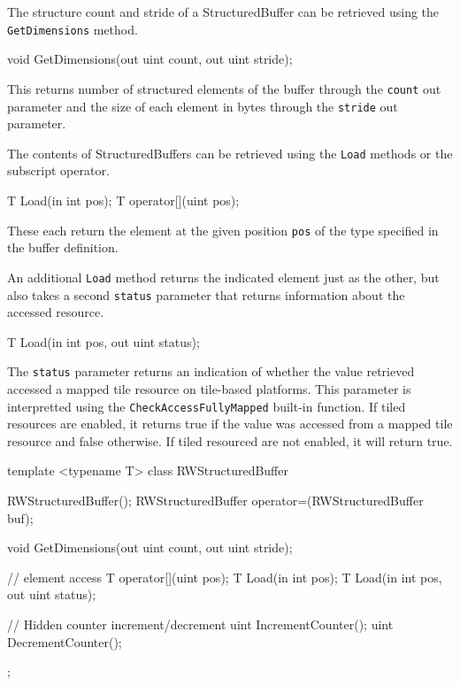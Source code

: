 
The structure count and stride of a StructuredBuffer can be retrieved using the \texttt{GetDimensions} method.
\begin{HLSL}
void GetDimensions(out uint count, out uint stride);
\end{HLSL}

This returns number of structured elements of the buffer through the \texttt{count} out parameter
and the size of each element in bytes through the \texttt{stride} out parameter.


The contents of StructuredBuffers can be retrieved using the \texttt{Load} methods
or the subscript operator.

\begin{HLSL}
 T Load(in int pos);
 T operator[](uint pos);
\end{HLSL}

These each return the element at the given position \texttt{pos} of the type specified in the buffer definition.

An additional \texttt{Load} method returns the indicated element just as the other,
but also takes a second \texttt{status} parameter that returns information about the accessed resource.
\begin{HLSL}
 T Load(in int pos, out uint status);
\end{HLSL}

The \texttt{status} parameter returns an indication of whether the value retrieved accessed a mapped tile
resource on tile-based platforms. This parameter is interpretted using the \texttt{CheckAccessFullyMapped}
built-in function. If tiled resources are enabled, it returns true if the value was accessed from a mapped
tile resource and false otherwise. If tiled resourced are not enabled, it will return true.


\begin{HLSL}
template <typename T>
 class RWStructuredBuffer {
   RWStructuredBuffer();
   RWStructuredBuffer operator=(RWStructuredBuffer buf);

   void GetDimensions(out uint count, out uint stride);

   // element access
   T operator[](uint pos);
   T Load(in int pos);
   T Load(in int pos, out uint status);

   // Hidden counter increment/decrement
   uint IncrementCounter();
   uint DecrementCounter();

};
\end{HLSL}

